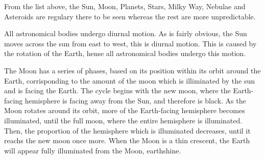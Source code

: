 \documentclass[a4paper, 12pt]{article}
\begin{document}
From the list above, the Sun, Moon, Planets, Stars, Milky Way, Nebulae and Asteroids are regulary there to be seen whereas the rest are more unpredictable.

All astronomical bodies undergo diurnal motion. As is fairly obvious, the Sun moves across the sun from east to west, this is diurnal motion. This is caused by the rotation of the Earth, hense all astronomical bodies undergo this motion.

The Moon has a series of phases, based on its position within its orbit around the Earth, corrisponding to the amount of the moon which is illiminated by the sun and is facing the Earth. The cycle begins with the new moon, where the Earth-facing hemisphere is facing away from the Sun, and therefore is black. As the Moon rotates around its orbit, more of the Earth-facing hemisphere becomes illuminated, until the full moon, where the entire hemisphere is illuminated. Then, the proportion of the hemisphere which is illuminated decreases, until it reachs the new moon once more. When the Moon is a thin crescent, the Earth will appear fully illuminated from the Moon, earthshine.
\end{document}
